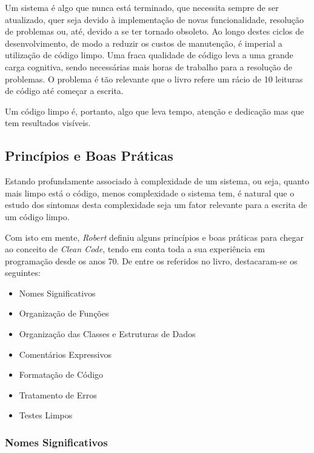 \documentclass[10pt,portuguese]{article}
\begin{document}
\par Um sistema é algo que nunca está terminado, que necessita sempre de ser atualizado, quer seja devido à implementação de novas funcionalidade, resolução de problemas ou, até, devido a se ter tornado obsoleto. Ao longo destes ciclos de desenvolvimento, de modo a reduzir os custos de manutenção, é imperial a utilização de código limpo. Uma fraca qualidade de código leva a uma grande carga cognitiva, sendo necessárias mais horas de trabalho para a resolução de problemas. O problema 
é tão relevante que o livro refere um rácio de 10 leituras de código até começar a escrita.

\par Um código limpo é, portanto, algo que leva tempo, atenção e dedicação mas que tem resultados visíveis.

\subsection{Princípios e Boas Práticas}

\par Estando profundamente associado à complexidade de um sistema, ou seja, quanto mais limpo está o código, menos complexidade o sistema tem, é natural que o estudo dos sintomas desta complexidade seja um fator relevante para a escrita de um código limpo. 

\par Com isto em mente, \textit{Robert} definiu alguns princípios e boas práticas para chegar ao conceito de \textit{Clean Code}, tendo em conta toda a sua experiência em programação desde os anos 70.  De entre os referidos no livro, destacaram-se os seguintes:

\begin{itemize}
    \item Nomes Significativos
    \item Organização de Funções
    \item Organização das Classes e Estruturas de Dados
    \item Comentários Expressivos
    \item Formatação de Código
    \item Tratamento de Erros
    \item Testes Limpos
\end{itemize}

\subsubsection{Nomes Significativos}
\end{document}
